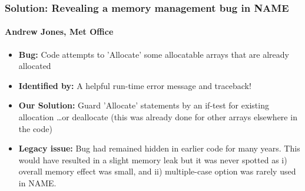 \documentclass{beamer}
\begin{document}
  \begin{frame}
    \frametitle{Solution: Revealing a memory management bug in NAME}
    \framesubtitle{Andrew Jones, Met Office}
    \begin{itemize}
       \item  {\bf Bug:}            Code attempts to 'Allocate' some allocatable
                                    arrays that are already allocated
       \item  {\bf Identified by:}  A helpful run-time error message and traceback!
       \item  {\bf Our Solution:}   Guard 'Allocate' statements by an if-test
                                    for existing allocation \ldots or deallocate
                                    (this was already done for other arrays
                                    elsewhere in the code)
       \item  {\bf Legacy issue:}   Bug had remained hidden in earlier code
                                    for many years. This would have resulted
                                    in a slight memory leak but it was never spotted
                                    as i) overall memory effect was small, and
                                    ii) multiple-case option was rarely used in NAME.
    \end{itemize}
  \end{frame}
\end{document}
